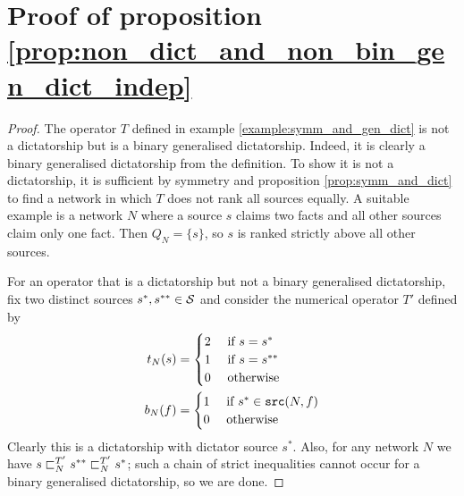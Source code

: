 \documentclass[../main.tex]{subfiles}
\begin{document}
\section{Proof of proposition \ref{prop:non_dict_and_non_bin_gen_dict_indep}}
\begin{proof}

The operator $T$ defined in example \ref{example:symm_and_gen_dict} is not a
dictatorship but is a binary generalised dictatorship. Indeed, it is clearly a
binary generalised dictatorship from the definition. To show it is not a
dictatorship, it is sufficient by symmetry and proposition
\ref{prop:symm_and_dict} to find a network in which $T$ does not rank all
sources equally. A suitable example is a network $N$ where a source $s$ claims
two facts and all other sources claim only one fact. Then $Q_N = \{s\}$, so $s$
is ranked strictly above all other sources.

For an operator that is a dictatorship but not a binary generalised
dictatorship, fix two distinct sources $s^*, s^{**} \in \S$ and consider the
numerical operator $T'$ defined by
\begin{align*}
    t_N(s) & = \begin{cases}
        2 & \text{ if } s = s^* \\
        1 & \text{ if } s = s^{**} \\
        0 & \text{ otherwise}
    \end{cases} \\
    b_N(f) & = \begin{cases}
        1 & \text{ if } s^* \in \src(N, f) \\
        0 & \text{ otherwise}
    \end{cases} \\
\end{align*}
Clearly this is a dictatorship with dictator source $s^*$. Also, for any
network $N$ we have $s \slt_N^{T'} s^{**} \slt_N^{T'} s^*$; such a chain of
strict inequalities cannot occur for a binary generalised dictatorship, so we
are done.

\end{proof}
\end{document}

